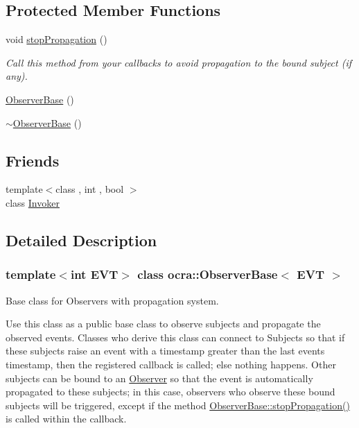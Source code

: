 \subsection*{Protected Member Functions}
\begin{DoxyCompactItemize}
\item 
void \hyperlink{classocra_1_1ObserverBase_ace47225f3ec0cf9985a885b0a95588e0}{stop\+Propagation} ()
\begin{DoxyCompactList}\small\item\em Call this method from your callbacks to avoid propagation to the bound subject (if any). \end{DoxyCompactList}\end{DoxyCompactItemize}
{\bf }\par
\begin{DoxyCompactItemize}
\item 
\hyperlink{classocra_1_1ObserverBase_aafa4d4e56d4849a38915b4803d869a8f}{Observer\+Base} ()
\item 
\hyperlink{classocra_1_1ObserverBase_ac7da945b97ccdbb8fdcff20ec38541da}{$\sim$\+Observer\+Base} ()
\end{DoxyCompactItemize}

\subsection*{Friends}
\begin{DoxyCompactItemize}
\item 
{\footnotesize template$<$class , int , bool $>$ }\\class \hyperlink{classocra_1_1ObserverBase_a63f148e01d4fc8e06b665e920abe3794}{Invoker}
\end{DoxyCompactItemize}


\subsection{Detailed Description}
\subsubsection*{template$<$int E\+VT$>$\newline
class ocra\+::\+Observer\+Base$<$ E\+V\+T $>$}

Base class for Observers with propagation system. 

Use this class as a public base class to observe subjects and propagate the observed events. Classes who derive this class can connect to Subjects so that if these subjects raise an event with a timestamp greater than the last event\textquotesingle{}s timestamp, then the registered callback is called; else nothing happens. Other subjects can be bound to an \hyperlink{classocra_1_1Observer}{Observer} so that the event is automatically propagated to these subjects; in this case, observers who observe these bound subjects will be triggered, except if the method \hyperlink{classocra_1_1ObserverBase_ace47225f3ec0cf9985a885b0a95588e0}{Observer\+Base\+::stop\+Propagation()} is called within the callback.

